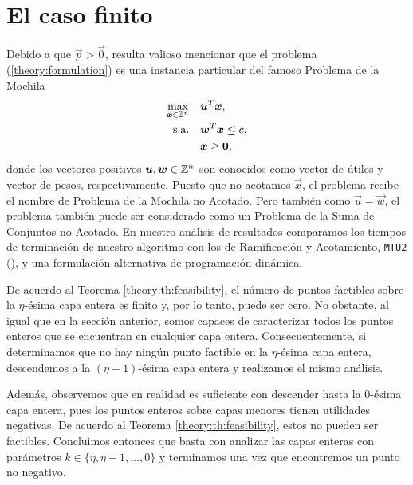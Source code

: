 \chapter{El caso finito}
\noindent
Debido a que $\vec{p} > \vec{0}$, resulta valioso mencionar que el problema
(\ref{theory:formulation}) es una instancia particular del famoso Problema de la Mochila
\begin{subequations}
	\label{knapsack-formulation}
	\begin{align}
		\max_{\boldsymbol{x} \in \mathbb{Z}^n} \quad
			& \boldsymbol{u}^T\boldsymbol{x}, \\
		\text{s.a.} \quad
			& \boldsymbol{w}^T\boldsymbol{x} \leq c, \\
			& \boldsymbol{x} \geq \boldsymbol{0},
	\end{align}
\end{subequations}
donde los vectores positivos $\boldsymbol{u}, \boldsymbol{w} \in \mathbb{Z}^n$ son conocidos como vector de útiles y
vector de pesos, respectivamente. Puesto que no acotamos $\vec{x}$, el problema recibe el nombre de
Problema de la Mochila no Acotado. Pero también como $\vec{u} = \vec{w}$, el problema
también puede ser considerado como un Problema de la Suma de Conjuntos no Acotado. En nuestro análisis
de resultados comparamos los tiempos de terminación de nuestro algoritmo con los de Ramificación y
Acotamiento, \texttt{MTU2} (\cite{martello}), y una formulación alternativa de programación dinámica.

De acuerdo al Teorema \ref{theory:th:feasibility}, el número de puntos factibles sobre la
$\eta$-ésima capa entera es finito y, por lo tanto, puede ser cero. No obstante, al igual que en la
sección anterior, somos capaces de caracterizar todos los puntos enteros que se encuentran en
cualquier capa entera. Consecuentemente, si determinamos que no hay ningún punto factible en la
$\eta$-ésima capa entera, descendemos a la $(\eta -1)$-ésima capa entera y realizamos el mismo
análisis.

Además, observemos que en realidad es suficiente con descender hasta la 0-ésima capa entera, pues
los puntos enteros sobre capas menores tienen utilidades negativas. De acuerdo al Teorema
\ref{theory:th:feasibility}, estos no pueden ser factibles. Concluimos entonces que basta con
analizar las capas enteras con parámetros $k \in \lbrace \eta, \eta - 1, \ldots, 0 \rbrace$ y
terminamos una vez que encontremos un punto no negativo.

